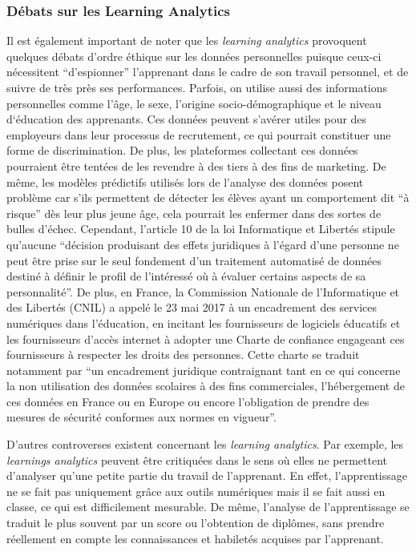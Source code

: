         \subsubsection{Débats sur les Learning Analytics}
    
            Il est également important de noter que les \emph{learning analytics} provoquent quelques débats d’ordre éthique sur les données personnelles puisque ceux-ci nécessitent \enquote{d’espionner} l’apprenant dans le cadre de son travail personnel, et de suivre de très près ses performances. Parfois, on utilise aussi des informations personnelles comme l’âge, le sexe, l’origine socio-démographique et le niveau  d‘éducation des apprenants. Ces données peuvent s’avérer utiles pour des employeurs dans leur processus de recrutement, ce qui pourrait constituer une forme de discrimination. De plus, les plateformes collectant ces données pourraient être tentées de les revendre à des tiers à des fins de marketing. De même, les modèles prédictifs utilisés lors de l’analyse des données posent problème car s’ils permettent de détecter les élèves ayant un comportement dit \enquote{à risque} dès leur plus jeune âge, cela pourrait les enfermer dans des sortes de bulles d’échec. Cependant, l’article 10 de la loi Informatique et Libertés stipule qu’aucune \enquote{décision produisant des effets juridiques à l’égard d’une personne ne peut être prise sur le seul fondement d’un traitement automatisé de données destiné à définir le profil de l’intéressé où à évaluer certains aspects de sa personnalité}. De plus, en France, la Commission Nationale de l’Informatique et des Libertés (CNIL) a appelé le 23 mai 2017 à un encadrement des services numériques dans l’éducation, en incitant les fournisseurs de logiciels éducatifs et les fournisseurs d’accès internet à adopter une Charte de confiance engageant ces fournisseurs à respecter les droits des personnes. Cette charte se traduit notamment par \enquote{un encadrement juridique contraignant tant en ce qui concerne la non utilisation des données scolaires à des fins commerciales, l’hébergement de ces données en France ou en Europe ou encore l’obligation de prendre des mesures de sécurité conformes aux normes en vigueur}.
        
            D’autres controverses existent concernant les \emph{learning analytics}. Par exemple, les \emph{learnings analytics} peuvent être critiquées dans le sens où elles ne permettent d’analyser qu’une petite partie du travail de l’apprenant. En effet, l’apprentissage ne se fait pas uniquement grâce aux outils numériques mais il se fait aussi en classe, ce qui est difficilement mesurable. De même, l’analyse de l’apprentissage se traduit le plus souvent par un score ou l’obtention de diplômes, sans prendre réellement en compte les connaissances et habiletés acquises par l’apprenant.
        
